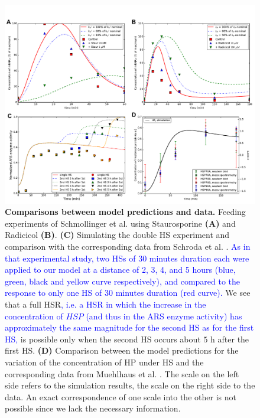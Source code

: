 \documentclass[oneside, 10pt, a4paper, twocolumn]{article}
\begin{document}
\begin{figure}
\centering
\includegraphics[width=\textwidth]{Figure3_Paper.pdf}
\caption{\small{\textbf{Comparisons between model predictions and data.} Feeding experiments of Schmollinger et al. \cite{Schmollinger2013} using Staurosporine \textbf{(A)} and Radicicol \textbf{(B)}. \textbf{(C)} Simulating the double HS experiment and comparison with the corresponding data from Schroda et al. \cite{Schroda2000}. \textcolor{blue}{As in that experimental study, two HSs of 30 minutes duration each were applied to our model at a distance of 2, 3, 4, and 5 hours (blue, green, black and yellow curve respectively), and compared to the response to only one HS of 30 minutes duration (red curve).} We see that a full HSR\textcolor{blue}{, i.e. a HSR in which the increase in the concentration of $HSP$ (and thus in the ARS enzyme activity) has approximately the same magnitude for the second HS as for the first HS,} is possible only when the second HS occurs about $5$ h after the first HS. \textbf{(D)} Comparison between the model predictions for the variation of the concentration of HP under HS and the corresponding data from Muehlhaus et al. \cite{Muehlhaus2011}. The scale on the left side refers to the simulation results, the scale on the right side to the data. An exact correspondence of one scale into the other is not possible since we lack the necessary information.}
}
\label{Figure3label}
\end{figure}

\clearpage
\end{document}
